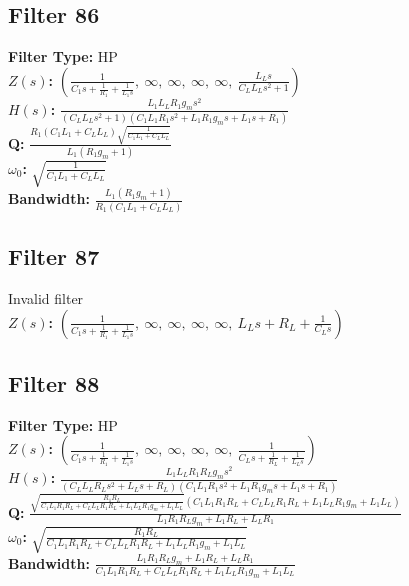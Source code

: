 \documentclass{article}
\begin{document}
\subsection*{Filter 86}
\textbf{Filter Type:} HP \\ 
\textbf{$Z(s)$:} $\left( \frac{1}{C_{1} s + \frac{1}{R_{1}} + \frac{1}{L_{1} s}}, \  \infty, \  \infty, \  \infty, \  \infty, \  \frac{L_{L} s}{C_{L} L_{L} s^{2} + 1}\right)$ \\ 
\textbf{$H(s)$:} $\frac{L_{1} L_{L} R_{1} g_{m} s^{2}}{\left(C_{L} L_{L} s^{2} + 1\right) \left(C_{1} L_{1} R_{1} s^{2} + L_{1} R_{1} g_{m} s + L_{1} s + R_{1}\right)}$ \\ 
\textbf{Q:} $\frac{R_{1} \left(C_{1} L_{1} + C_{L} L_{L}\right) \sqrt{\frac{1}{C_{1} L_{1} + C_{L} L_{L}}}}{L_{1} \left(R_{1} g_{m} + 1\right)}$ \\ 
\textbf{$\omega_0$:} $\sqrt{\frac{1}{C_{1} L_{1} + C_{L} L_{L}}}$ \\ 
\textbf{Bandwidth:} $\frac{L_{1} \left(R_{1} g_{m} + 1\right)}{R_{1} \left(C_{1} L_{1} + C_{L} L_{L}\right)}$ \\ 
\subsection*{Filter 87}
Invalid filter \\ 
\textbf{$Z(s)$:} $\left( \frac{1}{C_{1} s + \frac{1}{R_{1}} + \frac{1}{L_{1} s}}, \  \infty, \  \infty, \  \infty, \  \infty, \  L_{L} s + R_{L} + \frac{1}{C_{L} s}\right)$ \\ 
\subsection*{Filter 88}
\textbf{Filter Type:} HP \\ 
\textbf{$Z(s)$:} $\left( \frac{1}{C_{1} s + \frac{1}{R_{1}} + \frac{1}{L_{1} s}}, \  \infty, \  \infty, \  \infty, \  \infty, \  \frac{1}{C_{L} s + \frac{1}{R_{L}} + \frac{1}{L_{L} s}}\right)$ \\ 
\textbf{$H(s)$:} $\frac{L_{1} L_{L} R_{1} R_{L} g_{m} s^{2}}{\left(C_{L} L_{L} R_{L} s^{2} + L_{L} s + R_{L}\right) \left(C_{1} L_{1} R_{1} s^{2} + L_{1} R_{1} g_{m} s + L_{1} s + R_{1}\right)}$ \\ 
\textbf{Q:} $\frac{\sqrt{\frac{R_{1} R_{L}}{C_{1} L_{1} R_{1} R_{L} + C_{L} L_{L} R_{1} R_{L} + L_{1} L_{L} R_{1} g_{m} + L_{1} L_{L}}} \left(C_{1} L_{1} R_{1} R_{L} + C_{L} L_{L} R_{1} R_{L} + L_{1} L_{L} R_{1} g_{m} + L_{1} L_{L}\right)}{L_{1} R_{1} R_{L} g_{m} + L_{1} R_{L} + L_{L} R_{1}}$ \\ 
\textbf{$\omega_0$:} $\sqrt{\frac{R_{1} R_{L}}{C_{1} L_{1} R_{1} R_{L} + C_{L} L_{L} R_{1} R_{L} + L_{1} L_{L} R_{1} g_{m} + L_{1} L_{L}}}$ \\ 
\textbf{Bandwidth:} $\frac{L_{1} R_{1} R_{L} g_{m} + L_{1} R_{L} + L_{L} R_{1}}{C_{1} L_{1} R_{1} R_{L} + C_{L} L_{L} R_{1} R_{L} + L_{1} L_{L} R_{1} g_{m} + L_{1} L_{L}}$ \\ 
\end{document}
